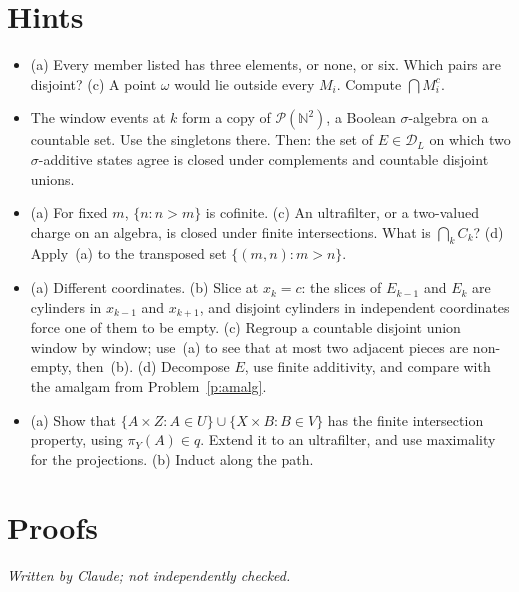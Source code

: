 \documentclass[11pt]{article}
\theoremstyle{definition}
\theoremstyle{remark}
\newcommand{\bbN}{\mathbb{N}}
\newcommand{\cD}{\mathcal{D}}
\begin{document}
\part{Hints}

\begin{itemize}
  \item[\ref{p:np}.] (a) Every member listed has three elements, or none, or six.
    Which pairs are disjoint? (c) A point $\omega$ would lie outside every $M_i$.
    Compute $\bigcap M_i^c$.
  \item[\ref{p:dirac}.] The window events at $k$ form a copy of
    $\mathcal P(\bbN^2)$, a Boolean $\sigma$-algebra on a countable set. Use the
    singletons there. Then: the set of $E\in\cD_L$ on which two
    $\sigma$-additive states agree is closed under complements and countable
    disjoint unions.
  \item[\ref{p:ring}.] (a) For fixed $m$, $\{n:n>m\}$ is cofinite. (c) An
    ultrafilter, or a two-valued charge on an algebra, is closed under finite
    intersections. What is $\bigcap_k C_k$? (d) Apply~(a) to the transposed set
    $\{(m,n):m>n\}$.
  \item[\ref{p:path}.] (a) Different coordinates. (b) Slice at $x_k=c$: the
    slices of $E_{k-1}$ and $E_k$ are cylinders in $x_{k-1}$ and $x_{k+1}$, and
    disjoint cylinders in independent coordinates force one of them to be empty.
    (c) Regroup a countable disjoint union window by window; use~(a) to see that
    at most two adjacent pieces are non-empty, then~(b). (d) Decompose $E$, use
    finite additivity, and compare with the amalgam from
    Problem~\ref{p:amalg}.
  \item[\ref{p:amalg}.] (a) Show that $\{A\times Z: A\in U\}\cup\{X\times B:B\in V\}$
    has the finite intersection property, using $\pi_Y(A)\in q$. Extend it to an
    ultrafilter, and use maximality for the projections. (b) Induct along the
    path.
\end{itemize}

\part{Proofs}
\noindent\emph{Written by Claude; not independently checked.}
\end{document}
